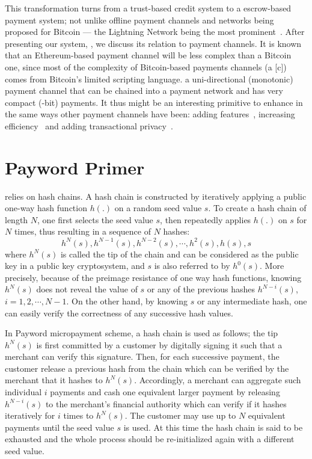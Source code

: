 This transformation turns \pw from a trust-based credit system to a escrow-based payment system; not unlike offline payment channels and networks being proposed for Bitcoin --- the Lightning Network being the most prominent~\cite{PD15}. After presenting our system, \ew, we discuss its relation to payment channels. It is known that an Ethereum-based payment channel will be less complex than a Bitcoin one, since most of the complexity of Bitcoin-based payments channels (\eg a [c]) comes from Bitcoin's limited scripting language. \ew a uni-directional (monotonic) payment channel that can be chained into a payment network and has very compact (-bit) payments. It thus might be an interesting primitive to enhance in the same ways other payment channels have been: adding features~\cite{DW15,PD15}, increasing efficiency~\cite{DEFM17,KG17,MBKM17} and adding transactional privacy~\cite{GM17,MMK+17,HAB+17,RMKG18}.


\section{Payword Primer}

\pw relies on hash chains. A hash chain is constructed by iteratively applying a public one-way hash function $h(.)$ on a random seed value $s$. To create a hash chain of length $N$, one first selects the seed value $s$, then repeatedly applies $h(.)$ on $s$ for $N$ times, thus resulting in a sequence of $N$ hashes:
\[h^N(s), h^{N-1}(s), h^{N-2}(s), \cdots, h^2(s), h(s),s \]
where $h^N(s)$ is called the tip of the chain and can be considered as the public key in a public key cryptosystem, and $s$ is also referred to by $h^0(s)$. More precisely, because of the preimage resistance of one way hash functions, knowing $h^N(s)$ does not reveal the value of $s$ or any of the previous hashes $h^{N-i}(s)$, $i=1,2,\cdots,N-1$. On the other hand, by knowing $s$ or any intermediate hash, one can easily verify the correctness of any successive hash values.

In Payword micropayment scheme, a hash chain is used as follows; the tip $h^N(s)$ is first committed by a customer by digitally signing it such that a merchant can verify this signature. Then, for each successive payment, the customer release a previous hash from the chain which can be verified by the merchant that it hashes to $h^N(s)$. Accordingly, a merchant can aggregate such individual $i$ payments and cash one equivalent larger payment by releasing $h^{N-i}(s)$ to the merchant's financial authority which can verify if it hashes iteratively for $i$ times to $h^N(s)$. The customer may use up to $N$ equivalent payments until the seed value $s$ is used. At this time the hash chain is said to be exhausted and the whole process should be re-initialized again with a different seed value. 

